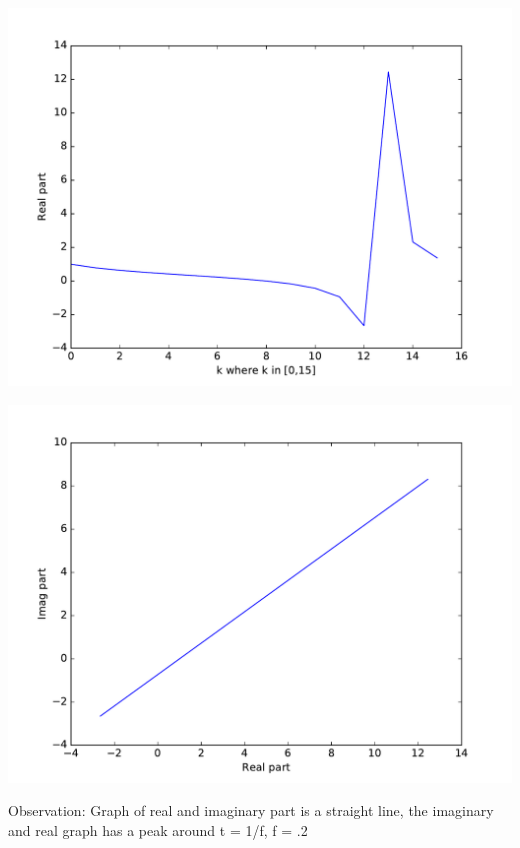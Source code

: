 \documentclass[a4paper,10pt]{article}
\begin{document}
\begin{center}
 \includegraphics[scale=.5]{fig3.pdf}
\end{center}
\begin{center}
 \includegraphics[scale=.5]{fig1.pdf}
\end{center}
Observation: Graph of real and imaginary part is a straight line, the imaginary and real graph has a peak around t = 1/f, f = .2
\end{document}
